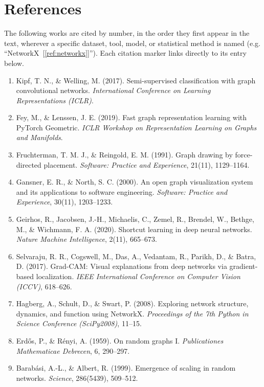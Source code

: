 \documentclass[11pt,letterpaper]{article}
\numberwithin{equation}{section}
\numberwithin{figure}{section}
\numberwithin{table}{section}
\begin{document}
\section{References}
\label{sec:references}
The following works are cited by number, in the order they first appear in the text, wherever a specific dataset, tool, model, or statistical method is named (e.g. ``NetworkX~[\ref{ref:networkx}]''). Each citation marker links directly to its entry below.
\begin{enumerate}
    \item \label{ref:gcn} Kipf, T. N., \& Welling, M. (2017). Semi-supervised classification with graph convolutional networks. \textit{International Conference on Learning Representations (ICLR)}.
    \item \label{ref:pyg} Fey, M., \& Lenssen, J. E. (2019). Fast graph representation learning with PyTorch Geometric. \textit{ICLR Workshop on Representation Learning on Graphs and Manifolds}.
    \item \label{ref:fruchterman} Fruchterman, T. M. J., \& Reingold, E. M. (1991). Graph drawing by force-directed placement. \textit{Software: Practice and Experience}, 21(11), 1129--1164.
    \item \label{ref:graphviz} Gansner, E. R., \& North, S. C. (2000). An open graph visualization system and its applications to software engineering. \textit{Software: Practice and Experience}, 30(11), 1203--1233.
    \item \label{ref:geirhos} Geirhos, R., Jacobsen, J.-H., Michaelis, C., Zemel, R., Brendel, W., Bethge, M., \& Wichmann, F. A. (2020). Shortcut learning in deep neural networks. \textit{Nature Machine Intelligence}, 2(11), 665--673.
    \item \label{ref:gradcam} Selvaraju, R. R., Cogswell, M., Das, A., Vedantam, R., Parikh, D., \& Batra, D. (2017). Grad-CAM: Visual explanations from deep networks via gradient-based localization. \textit{IEEE International Conference on Computer Vision (ICCV)}, 618--626.
    \item \label{ref:networkx} Hagberg, A., Schult, D., \& Swart, P. (2008). Exploring network structure, dynamics, and function using NetworkX. \textit{Proceedings of the 7th Python in Science Conference (SciPy2008)}, 11--15.
    \item \label{ref:erdosrenyi} Erdős, P., \& Rényi, A. (1959). On random graphs I. \textit{Publicationes Mathematicae Debrecen}, 6, 290--297.
    \item \label{ref:barabasialbert} Barabási, A.-L., \& Albert, R. (1999). Emergence of scaling in random networks. \textit{Science}, 286(5439), 509--512.

\end{enumerate}
\end{document}
